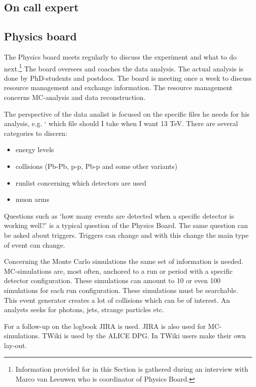 \subsection{On call expert}

\subsection{Physics board}
The Physics board meets regularly to discuss the experiment and what to do next.\footnote{Information provided for in this Section is gathered during an interview with Marco van Leeuwen who is coordinator of Physics Board.} The board oversees and coaches the data analysis. The actual analysis is done by PhD-students and postdocs. The board is meeting once a week to discuss resource management and exchange information. The resource management concerns MC-analysis and data reconstruction. 

The perspective of the data analist is focused on the specific files he needs for his analysis, e.g. ` which file should I take when I want 13 TeV. There are several categories to discern:
\begin{itemize}
  \item energy levels
  \item collisions (Pb-Pb, p-p, Pb-p and some other variants)
  \item runlist concerning which detectors are used
  \item muon arms
\end{itemize}
Questions such as `how many events are detected when a specific detector is working well?' is a typical question of the Physics Board. The same question can be asked about triggers. Triggers can change and with this change the main type of event can change.

Concerning the Monte Carlo simulations the same set of information is needed. MC-simulations are, most often, anchored to a run or period with a specific detector configuration. These simulations can amount to 10 or even 100 simulations for each run configuration. These simulations must be searchable. This event generator creates a lot of collisions which can be of interest. An analysts seeks for photons, jets, strange particles etc.

For a follow-up on the logbook JIRA is used. JIRA is also used for MC-simulations. TWiki is used by the ALICE DPG. In TWiki users make their own lay-out. 

